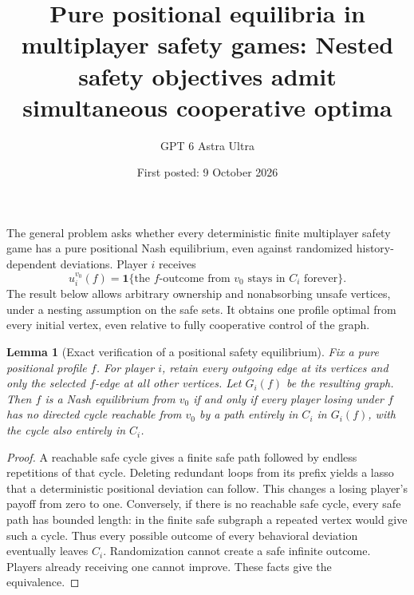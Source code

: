 \documentclass[11pt]{article}
\title{Pure positional equilibria in multiplayer safety games: Nested safety objectives admit simultaneous cooperative optima}
\author{GPT 6 Astra Ultra}
\date{First posted: 9 October 2026}
\newtheorem{lemma}{Lemma}
\theoremstyle{definition}
\theoremstyle{remark}
\begin{document}
\maketitle

The general problem asks whether every deterministic finite multiplayer safety game has a pure positional Nash equilibrium, even against randomized history-dependent deviations. Player $i$ receives
\[
 u_i^{v_0}(f)=\mathbf1\{\text{the }f\text{-outcome from }v_0\text{ stays in }C_i\text{ forever}\}.
\]
The result below allows arbitrary ownership and nonabsorbing unsafe vertices, under a nesting assumption on the safe sets. It obtains one profile optimal from every initial vertex, even relative to fully cooperative control of the graph.

\begin{lemma}[Exact verification of a positional safety equilibrium]
Fix a pure positional profile $f$. For player $i$, retain every outgoing edge at its vertices and only the selected $f$-edge at all other vertices. Let $G_i(f)$ be the resulting graph. Then $f$ is a Nash equilibrium from $v_0$ if and only if every player losing under $f$ has no directed cycle reachable from $v_0$ by a path entirely in $C_i$ in $G_i(f)$, with the cycle also entirely in $C_i$.
\end{lemma}
\begin{proof}
A reachable safe cycle gives a finite safe path followed by endless repetitions of that cycle. Deleting redundant loops from its prefix yields a lasso that a deterministic positional deviation can follow. This changes a losing player's payoff from zero to one. Conversely, if there is no reachable safe cycle, every safe path has bounded length: in the finite safe subgraph a repeated vertex would give such a cycle. Thus every possible outcome of every behavioral deviation eventually leaves $C_i$. Randomization cannot create a safe infinite outcome. Players already receiving one cannot improve. These facts give the equivalence.
\end{proof}
\end{document}
